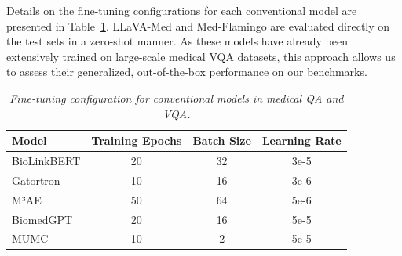 \documentclass{article}
\begin{document}
Details on the fine-tuning configurations for each conventional model are presented in Table~\ref{tab:finetuning_configuration_medqa_appendix}. LLaVA-Med and Med-Flamingo are evaluated directly on the test sets in a zero-shot manner. As these models have already been extensively trained on large-scale medical VQA datasets, this approach allows us to assess their generalized, out-of-the-box performance on our benchmarks.

\begin{table}[!ht]
\centering
\footnotesize
\caption{\textit{Fine-tuning configuration for conventional models in medical QA and VQA.}}
\label{tab:finetuning_configuration_medqa_appendix}
\begin{tabular}{lccc}
\toprule
\textbf{Model}     & \textbf{Training Epochs} & \textbf{Batch Size} &\textbf{Learning Rate} \\ \midrule
BioLinkBERT  & 20             & 32         & 3e-5          \\
Gatortron & 10             & 16         & 3e-6          \\
M³AE      & 50             & 64         & 5e-6          \\
BiomedGPT & 20             & 16         & 5e-5          \\
MUMC      & 10             & 2          & 5e-5          \\
\bottomrule
\end{tabular}
\end{table}
\end{document}
